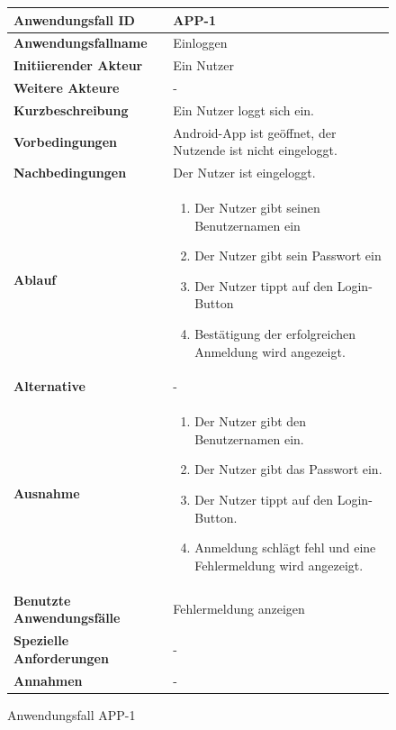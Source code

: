 \newpage

\begin{figure}[h]
	\centering
	\begin{tabularx}{\textwidth}{ X | X }
		\textbf{Anwendungsfall ID} & APP-1 \\ \hline
		\textbf{Anwendungsfallname} & Einloggen \\ \hline
		\textbf{Initiierender Akteur} & Ein Nutzer \\ \hline
		\textbf{Weitere Akteure} & -  \\ \hline
		\textbf{Kurzbeschreibung} & Ein Nutzer loggt sich ein. \\ \hline
		\textbf{Vorbedingungen} & Android-App ist geöffnet, der Nutzende ist nicht eingeloggt. \\ \hline
		\textbf{Nachbedingungen} & Der Nutzer ist eingeloggt. \\ \hline
		\textbf{Ablauf} &
			\begin{enumerate}
				\item Der Nutzer gibt seinen Benutzernamen ein
				\item Der Nutzer gibt sein Passwort ein
				\item Der Nutzer tippt auf den Login-Button
				\item Bestätigung der erfolgreichen Anmeldung wird angezeigt.
			\end{enumerate} \\ \hline
		\textbf{Alternative} &
				- \\ \hline
		\textbf{Ausnahme} &
				\begin{enumerate}
					\item Der Nutzer gibt den Benutzernamen ein.
					\item Der Nutzer gibt das Passwort ein.
					\item Der Nutzer tippt auf den Login-Button.
					\item Anmeldung schlägt fehl und eine Fehlermeldung wird angezeigt.
				\end{enumerate}  \\ \hline
		\textbf{Benutzte Anwendungsfälle} & Fehlermeldung anzeigen \\ \hline
		\textbf{Spezielle Anforderungen} & - \\ \hline
		\textbf{Annahmen} & -
	\end{tabularx}
	\caption{Anwendungsfall APP-1}
	\label{fig:anwendungsfall-app-tabelle-APP-1}
\end{figure}

\newpage

